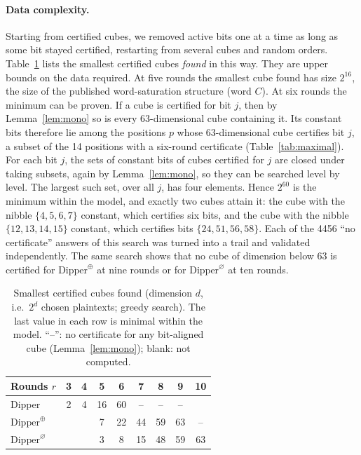 \documentclass[11pt,a4paper]{article}
\theoremstyle{definition}
\theoremstyle{remark}
\begin{document}
\paragraph{Data complexity.} Starting from certified cubes, we removed active bits one at a time as long as some bit stayed certified, restarting from several cubes and random orders. Table~\ref{tab:frontier} lists the smallest certified cubes \emph{found} in this way. They are upper bounds on the data required. At five rounds the smallest cube found has size $2^{16}$, the size of the published word-saturation structure (word $C$). At six rounds the minimum can be proven. If a cube is certified for bit $j$, then by Lemma~\ref{lem:mono} so is every 63-dimensional cube containing it. Its constant bits therefore lie among the positions $p$ whose 63-dimensional cube certifies bit $j$, a subset of the 14 positions with a six-round certificate (Table~\ref{tab:maximal}). For each bit $j$, the sets of constant bits of cubes certified for $j$ are closed under taking subsets, again by Lemma~\ref{lem:mono}, so they can be searched level by level. The largest such set, over all $j$, has four elements. Hence $2^{60}$ is the minimum within the model, and exactly two cubes attain it: the cube with the nibble $\{4,5,6,7\}$ constant, which certifies six bits, and the cube with the nibble $\{12,13,14,15\}$ constant, which certifies bits $\{24,51,56,58\}$. Each of the 4456 ``no certificate'' answers of this search was turned into a trail and validated independently. The same search shows that no cube of dimension below 63 is certified for $\mathrm{Dipper}^{\oplus}$ at nine rounds or for $\mathrm{Dipper}^{\varnothing}$ at ten rounds.

\begin{table}[t]\centering
\caption{Smallest certified cubes found (dimension $d$, i.e.\ $2^d$ chosen plaintexts; greedy search). The last value in each row is minimal within the model. ``--'': no certificate for any bit-aligned cube (Lemma~\ref{lem:mono}); blank: not computed.}\label{tab:frontier}
\begin{tabular}{lcccccccc}
\toprule
Rounds $r$ & 3 & 4 & 5 & 6 & 7 & 8 & 9 & 10\\
\midrule
Dipper & 2 & 4 & 16 & 60 & -- & -- & -- & \\
$\mathrm{Dipper}^{\oplus}$ & & & 7 & 22 & 44 & 59 & 63 & --\\
$\mathrm{Dipper}^{\varnothing}$ & & & 3 & 8 & 15 & 48 & 59 & 63\\
\bottomrule
\end{tabular}
\end{table}
\end{document}
